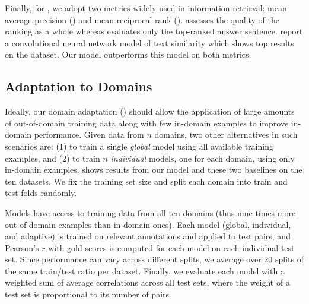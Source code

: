 Finally, for \asr{}, we adopt two metrics widely used in information
retrieval: mean average precision () and mean reciprocal rank
().   assesses the quality of the ranking as a whole whereas
 evaluates only the top-ranked answer sentence.  
report a convolutional neural network model of text similarity which shows top
\asr{} results on the  dataset.  Our model outperforms
this model on both metrics.

\subsection{Adaptation to \sts{} Domains}
\label{section:experiments-sts-da}


Ideally, our domain adaptation (\da{}) should allow the application of
large amounts of out-of-domain training data along with few in-domain
examples to improve in-domain performance.  Given data from $n$
domains, two other alternatives in such scenarios are: (1) to train a
single \emph{global} model using all available training examples, and
(2) to train $n$ \emph{individual} models, one for each domain, using
only in-domain examples.   shows
results from our \da{} model and these two baselines on the ten \sts{}
datasets.  We fix the training set size and split each
domain into train and test folds randomly.

Models have access to training data from all ten domains (thus nine times more
out-of-domain examples than in-domain ones).  Each model (global, individual,
and adaptive) is trained on relevant annotations and applied to test pairs,
and Pearson's $r$ with gold scores is computed for each model on each individual
test set.  Since performance can vary across different splits, we average over
20 splits of the same train/test ratio per dataset.  Finally, we evaluate each
model with a weighted sum of average correlations across all test sets, where
the weight of a test set is proportional to its number of pairs.

